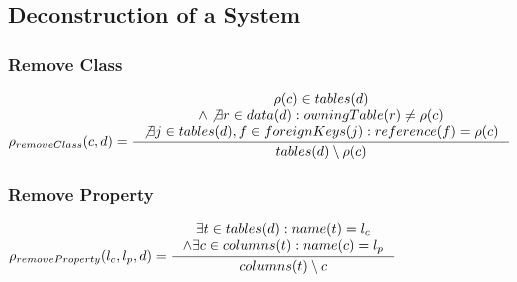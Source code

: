 \documentclass[11pt]{article}
\begin{document}
\subsection{Deconstruction of a System}
\subsubsection{Remove Class}
$
\rho_{removeClass}(c,d) = \inference{\rho(c) \in tables(d) \\ \wedge \not \exists r \in data(d) : owningTable(r) \neq \rho(c) \\ \not \exists j \in tables(d), f \in foreignKeys(j) : reference(f) = \rho(c)  }{tables(d) \setminus \rho(c)}
$

\subsubsection{Remove Property}
$
\rho_{removeProperty}(l_c, l_p, d) = \inference{\exists t \in tables(d) : name(t) = l_c \\ \wedge \exists c \in columns(t) : name(c) = l_p  }{
columns(t) \setminus c
}
$

	
\end{document}
